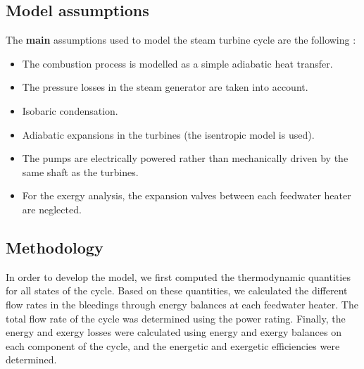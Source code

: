 \subsection{Model assumptions}

The \textbf{main} assumptions used to model the steam turbine cycle are the following :
\begin{itemize}
    \setlength\itemsep{0em}
    \item The combustion process is modelled as a simple adiabatic heat transfer.
    \item The pressure losses in the steam generator are taken into account.
    \item Isobaric condensation.
    \item Adiabatic expansions in the turbines (the isentropic model is used).
    \item The pumps are electrically powered rather than mechanically driven by the same shaft as the turbines.
    \item For the exergy analysis, the expansion valves between each feedwater heater are neglected.
\end{itemize}

\subsection{Methodology}

In order to develop the model, we first computed the thermodynamic quantities for all states of the cycle.
Based on these quantities, we calculated the different flow rates
in the bleedings through energy balances at each feedwater heater.
The total flow rate of the cycle was determined using the power rating.
Finally, the energy and exergy losses were calculated using energy and 
exergy balances on each component of the cycle,
and the energetic and exergetic efficiencies were determined.
